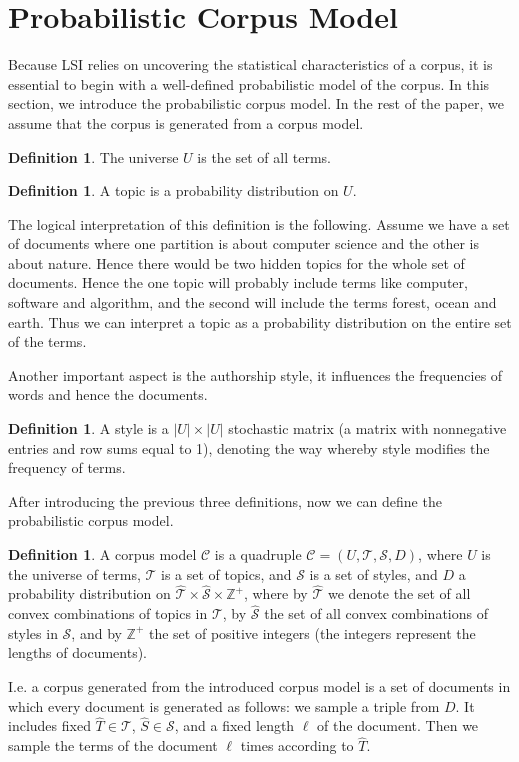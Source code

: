 \documentclass[a4paper,11pt,DIV=15]{scrartcl} %
\theoremstyle{plain}
\theoremstyle{definition}
\newtheorem{definition}[theorem]{Definition}
\begin{document}
 

\section{Probabilistic Corpus Model} %
Because LSI relies on uncovering the statistical characteristics of a corpus, it is essential to begin with a well-defined probabilistic model of the corpus.
In this section, we introduce the probabilistic corpus model.
In the rest of the paper, we assume that the corpus is generated from a corpus model.

\begin{definition}
The universe $U$ is the set of all terms.
\end{definition}
\begin{definition}
A topic is a probability distribution on $U$.
\end{definition}
The logical interpretation of this definition is the following. Assume we have a set of documents where one partition is about computer science and the other is about nature. Hence there would be two hidden topics for the whole set of documents.
Hence the one topic will probably include terms like computer, software and algorithm, and the second will include the terms forest, ocean and earth. Thus we can interpret a topic as a probability distribution on the entire set of the terms.

Another important aspect is the authorship style, it influences the frequencies of words and hence the documents. 
\begin{definition}
    A style is a $|U| \times|U|$ stochastic matrix (a matrix with nonnegative entries and row sums equal to 1), denoting the way whereby style modifies
the frequency of terms.
\end{definition}

After introducing the previous three definitions, now we can define the probabilistic corpus model.
\begin{definition}
     A corpus model $\mathscr{C}$ is a quadruple $\mathscr{C} = (U,\mathscr{T}, \mathscr{S}, D)$, where $U$ is
the universe of terms, $\mathscr{T}$ is a set of topics, and $\mathscr{S}$ is a set of styles, and $D$ a probability distribution on $\hat{\mathscr{T}} \times \hat{\mathscr{S}} \times \mathbb{Z}^+$, where by $\hat{\mathscr{T}}$ we denote the set of all convex combinations of topics in $\mathscr{T}$, by $\hat{\mathscr{S}}$ the set of all convex combinations of styles in $\mathscr{S}$, and by 
$\mathbb{Z}^+$ the set of positive integers (the integers represent the lengths of documents).
\end{definition}
I.e. a corpus generated from the introduced corpus model is a set of documents in which every document is generated as follows: we sample a triple from $D$. It includes fixed $\hat{T} \in \mathscr{T}$, $\hat{S} \in \mathscr{S}$, and a fixed length $\ell$ of the document. Then we sample the terms of the document $\ell$ times according to $\hat{T}$.
\end{document}
